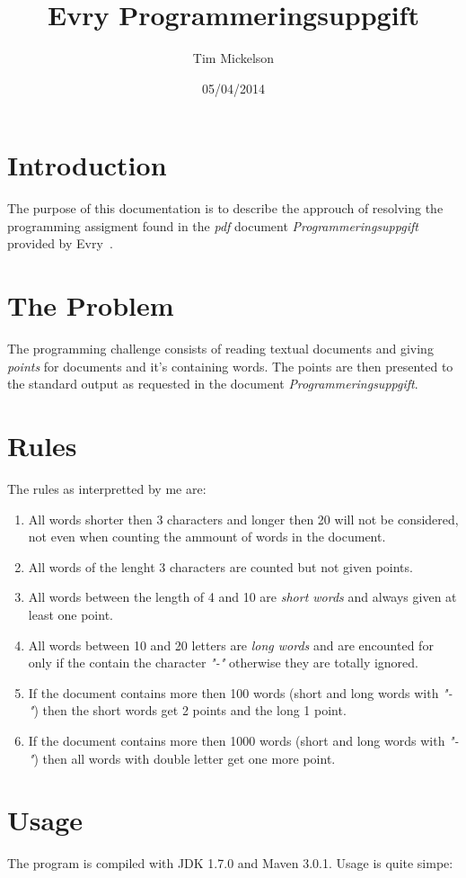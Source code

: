 \documentclass[a4paper]{article}
\title{Evry Programmeringsuppgift}
\author{Tim Mickelson}
\date{05/04/2014}
\begin{document}
\maketitle

\newpage

\section{Introduction}
The purpose of this documentation is to describe the approuch of resolving the programming assigment found in the \textit{pdf} document \textit{Programmeringsuppgift} provided by Evry~\cite{pdf}.

\section{The Problem}
The programming challenge consists of reading textual documents and giving \textit{points} for documents and it's containing words. The points are then presented to the standard output as requested in the
document \textit{Programmeringsuppgift}.

\section{Rules}
The rules as interpretted by me are:
\begin{enumerate}
	\item All words shorter then 3 characters and longer then 20 will not be considered, not even when counting the ammount of words in the document.
	\item All words of the lenght 3 characters are counted but not given points.
	\item All words between the length of 4 and 10 are \textit{short words} and always given at least one point.
	\item All words between 10 and 20 letters are \textit{long words} and are encounted for only if the contain the character \textit{"-"} otherwise they are totally ignored.
	\item If the document contains more then 100 words (short and long words with \textit{"-"}) then the short words get 2 points and the long 1 point.
	\item If the document contains more then 1000 words (short and long words with \textit{"-"}) then all words with double letter get one more point.
\end{enumerate}

\section{Usage}
The program is compiled with JDK 1.7.0 and Maven 3.0.1. Usage is quite simpe:
\end{document}
